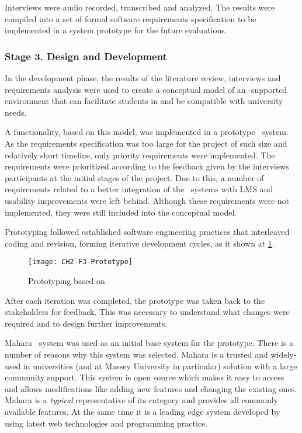 Interviews were audio recorded, transcribed and analyzed. The results were
compiled into a set of formal software requirements specification to be
implemented in a system prototype for the future evaluations.

\subsubsection{Stage 3. Design and Development}

In the development phase, the results of the literature review, interviews and
requirements analysis were used to create a conceptual model of an \ep-supported
environment that can facilitate students in \LLLs and be compatible with
university needs.

A functionality, based on this model, was implemented in a prototype \ep~system.
As the requirements specification was too large for the project of such size and
relatively short timeline, only priority requirements were implemented. The
requirements were prioritized according to the feedback given by the interviews
participants at the initial stages of the project. Due to this, a number of
requirements related to a better integration of the \ep~systems with LMS and
usability improvements were left behind. Although these requirements were not
implemented, they were still included into the conceptual model.

Prototyping followed established software engineering practices that interleaved
coding and revision, forming iterative development cycles, as it shown at
\ref{fig:prototype}.

\begin{figure}[htb]
\centering
\texttt{[image: CH2-F3-Prototype]}
\caption[Ptototyping]{Prototyping based on \citet*[p.~411]{Sommerville2007}}
\label{fig:prototype}
\end{figure}

After each iteration was completed, the prototype was taken back to the
stakeholders for feedback. This was necessary to understand what changes were
required and to design further improvements.

Mahara \ep~system was used as an initial base system for the prototype. There
is a number of reasons why this system was selected. Mahara is a trusted and
widely-used in universities (and at Massey University in particular) solution
with a large community support. This system is open source which makes it easy
to access and allows modifications like adding new features and changing the
existing ones. Mahara is a \textit{typical} representative of its category and
provides all commonly available features. At the same time it is a leading edge
system developed by using latest web technologies and programming practice.

